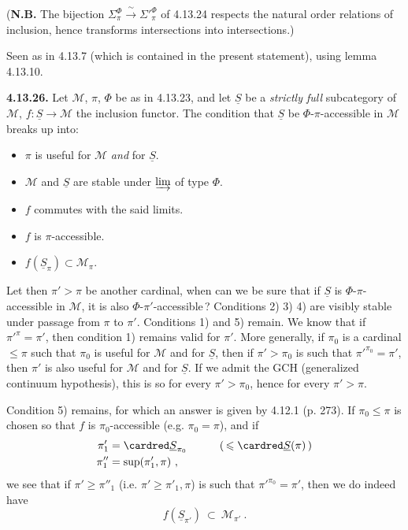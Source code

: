 (\textbf{N.B.} The bijection $\Sigma^{\Phi}_{\pi}\xrightarrow{\ \sim\ }{\Sigma'}^{\Phi}_{\pi}$ of 4.13.24 respects the natural order relations of inclusion, hence transforms intersections into intersections.)

Seen as in 4.13.7 (which is contained in the present statement), using lemma 4.13.10.

\textbf{4.13.26.} Let $\mathcal{M}$, $\pi$, $\Phi$ be as in 4.13.23, and let $\underline{S}$ be a \textit{strictly full} subcategory of $\mathcal{M}$, $f:\underline{S}\longrightarrow\mathcal{M}$ the inclusion functor. The condition that $\underline{S}$ be $\Phi$-$\pi$-accessible in $\mathcal{M}$ breaks up into:
\begin{itemize}[leftmargin=2.5em]
\item[1)] $\pi$ is useful for $\mathcal{M}$ \textit{and} for $\underline{S}$.
\item[2)] $\mathcal{M}$ and $\underline{S}$ are stable under $\varinjlim$ of type $\Phi$.
\item[3)] $f$ commutes with the said limits.
\item[4)] $f$ is $\pi$-accessible.
\item[5)] $f(\underline{S}_\pi)\subset\mathcal{M}_\pi$.
\end{itemize}

Let then $\pi'>\pi$ be another cardinal, when can we be sure that if $\underline{S}$ is $\Phi$-$\pi$-accessible in $\mathcal{M}$, it is also $\Phi$-$\pi'$-accessible\,? Conditions 2) 3) 4) are visibly stable under passage from $\pi$ to $\pi'$. Conditions 1) and 5) remain. We know that if $\pi'^{\pi}=\pi'$, then condition 1) remains valid for $\pi'$. More generally, if $\pi_0$ is a cardinal $\leqslant\pi$ such that $\pi_0$ is useful for $\mathcal{M}$ and for $\underline{S}$, then if $\pi'>\pi_0$ is such that $\pi'^{\pi_0}=\pi'$, then $\pi'$ is also useful for $\mathcal{M}$ and for $\underline{S}$. If we admit the GCH (generalized continuum hypothesis), this is so for every $\pi'>\pi_0$, hence for every $\pi'>\pi$.

Condition 5) remains, for which an answer is given by 4.12.1 (p. 273). If $\pi_0\leqslant\pi$ is chosen so that $f$ is $\pi_0$-accessible (e.g. $\pi_0=\pi$), and if
\[
\begin{aligned}
\pi'_1 &= \cardred\underline{S}_{\pi_0} \qquad\quad (\,\leqslant\cardred\underline{S}(\pi)\,)\\
\pi''_1 &= \sup(\pi'_1,\pi)\ ,
\end{aligned}
\]
we see that if $\pi'\geqslant\pi''_1$ (i.e. $\pi'\geqslant\pi'_1,\pi$) is such that $\pi'^{\pi_0}=\pi'$, then we do indeed have
\[ f(\underline{S}_{\pi'})\ \subset\ \mathcal{M}_{\pi'}\ . \]

